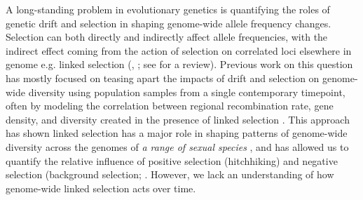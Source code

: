\documentclass[11pt]{article}
\newcommand{\gc}[1]{{\it \color{red} #1 } }
\begin{document}
A long-standing problem in evolutionary genetics is quantifying the roles of
genetic drift and selection in shaping genome-wide allele frequency changes.
Selection can both directly and indirectly affect allele frequencies, with the
indirect effect coming from the action of selection on correlated loci
elsewhere in genome e.g. linked selection (\cite{Maynard_Smith1974-lc},
\cite{Charlesworth1993-gb,Nordborg1996-nq}; see \cite{Barton2000-zg} for a
review). Previous work on this question has mostly focused on teasing apart
the impacts of drift and selection on genome-wide diversity using population
samples from a single contemporary timepoint, often by modeling the correlation
between regional recombination rate, gene density, and diversity created in the
presence of linked selection \parencite{SellaReview2009,CutterPayseur}. This  %
approach has shown linked selection has a major role in shaping patterns of
genome-wide diversity across the genomes of \gc{a range of sexual species}
\parencite{Begun2007-bg,Beissinger2016-cm,Sattath2011-dr,Williamson2014-oy,Andersen2012-bj,Cutter2010-gi,Elyashiv2016-v},
and has allowed us to quantify the relative influence of positive selection
(hitchhiking) and negative selection (background selection;
\cite{Nordborg2005-dc,McVicker2009-ax,Hernandez2011-gs,Elyashiv2016-vt}.
However, we lack an understanding of how genome-wide linked selection acts over
time.
\end{document}
